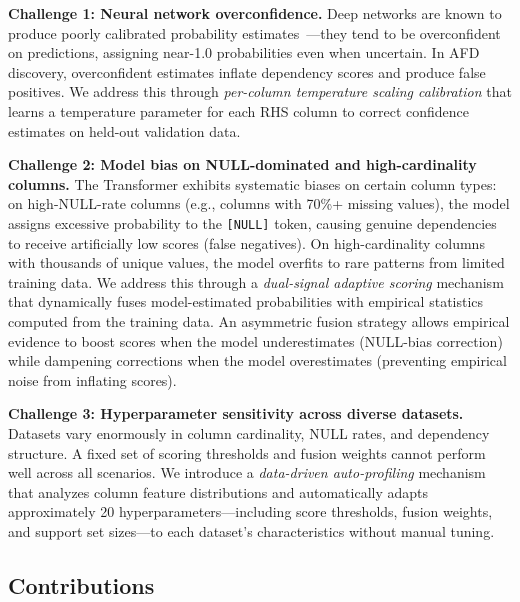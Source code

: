 \documentclass[conference]{IEEEtran}
\begin{document}
\textbf{Challenge 1: Neural network overconfidence.} Deep networks are known to produce poorly calibrated probability estimates~\cite{temp_scaling}---they tend to be overconfident on predictions, assigning near-1.0 probabilities even when uncertain. In AFD discovery, overconfident estimates inflate dependency scores and produce false positives. We address this through \emph{per-column temperature scaling calibration} that learns a temperature parameter for each RHS column to correct confidence estimates on held-out validation data.

\textbf{Challenge 2: Model bias on NULL-dominated and high-cardinality columns.} The Transformer exhibits systematic biases on certain column types: on high-NULL-rate columns (e.g., columns with 70\%+ missing values), the model assigns excessive probability to the \texttt{[NULL]} token, causing genuine dependencies to receive artificially low scores (false negatives). On high-cardinality columns with thousands of unique values, the model overfits to rare patterns from limited training data. We address this through a \emph{dual-signal adaptive scoring} mechanism that dynamically fuses model-estimated probabilities with empirical statistics computed from the training data. An asymmetric fusion strategy allows empirical evidence to boost scores when the model underestimates (NULL-bias correction) while dampening corrections when the model overestimates (preventing empirical noise from inflating scores).

\textbf{Challenge 3: Hyperparameter sensitivity across diverse datasets.} Datasets vary enormously in column cardinality, NULL rates, and dependency structure. A fixed set of scoring thresholds and fusion weights cannot perform well across all scenarios. We introduce a \emph{data-driven auto-profiling} mechanism that analyzes column feature distributions and automatically adapts approximately 20 hyperparameters---including score thresholds, fusion weights, and support set sizes---to each dataset's characteristics without manual tuning.

\subsection*{Contributions}
\end{document}
